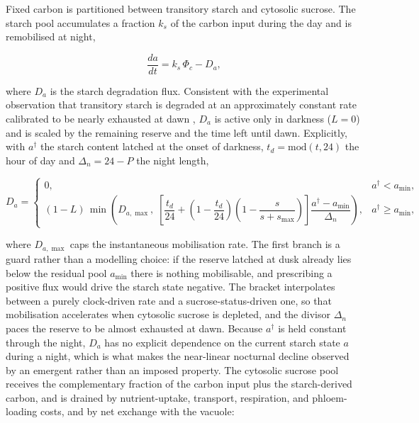 \documentclass[a4paper,fleqn]{cas-sc}
\begin{document}
Fixed carbon is partitioned between transitory starch and cytosolic
sucrose. The starch pool accumulates a fraction $k_s$ of the carbon input
during the day and is remobilised at night,

\begin{equation}
\frac{da}{dt} = k_s\,\Phi_c - D_a,
\label{eq:starch}
\end{equation}

where $D_a$ is the starch degradation flux. Consistent with the
experimental observation that transitory starch is degraded at an
approximately constant rate calibrated to be nearly exhausted at dawn
\citep{Graf2010,Scialdone2013,Stitt2012}, $D_a$ is active only in
darkness ($L=0$) and is scaled by the remaining reserve and the time left
until dawn. Explicitly, with $a^{\dagger}$ the starch content latched at
the onset of darkness, $t_d = \mathrm{mod}(t,24)$ the hour of day and
$\Delta_n = 24 - P$ the night length,

\begin{equation}
D_a =
\begin{cases}
0, & a^{\dagger} < a_{\min},\\[6pt]
(1-L)\,
\min\!\left(
D_{a,\max},\;
\left[
\dfrac{t_d}{24}
+ \left(1-\dfrac{t_d}{24}\right)
\left(1 - \dfrac{s}{s+s_{\max}}\right)
\right]
\dfrac{a^{\dagger}-a_{\min}}{\Delta_n}
\right),
& a^{\dagger} \ge a_{\min},
\end{cases}
\label{eq:starch_degradation}
\end{equation}

where $D_{a,\max}$ caps the instantaneous mobilisation rate. The first
branch is a guard rather than a modelling choice: if the reserve latched at
dusk already lies below the residual pool $a_{\min}$ there is nothing
mobilisable, and prescribing a positive flux would drive the starch state
negative. The bracket interpolates between a purely clock-driven rate and a
sucrose-status-driven one, so that mobilisation accelerates when cytosolic
sucrose is depleted, and the divisor $\Delta_n$ paces the reserve to be
almost exhausted at dawn. Because $a^{\dagger}$ is held constant through
the night, $D_a$ has no explicit dependence on the current starch state $a$
during a night, which is what makes the near-linear nocturnal decline
observed by \citet{Graf2010} an emergent rather than an imposed property.
The cytosolic sucrose pool receives the complementary fraction
of the carbon input plus the starch-derived carbon, and is drained by
nutrient-uptake, transport, respiration, and phloem-loading costs, and by
net exchange with the vacuole:
\end{document}
